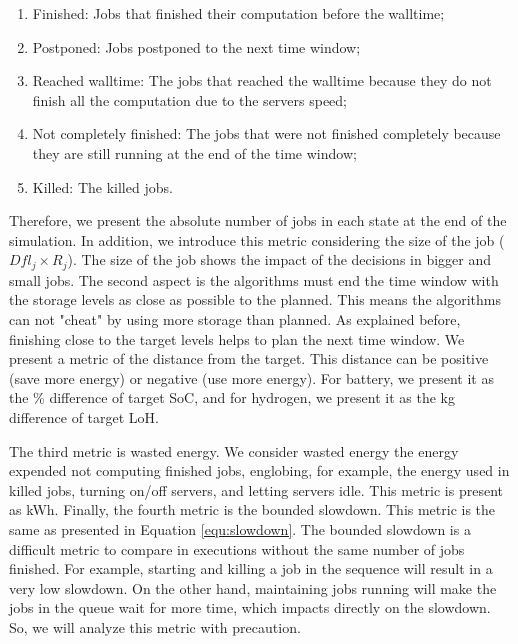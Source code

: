 \begin{enumerate}
    \item Finished: Jobs that finished their computation before the walltime;
    \item Postponed: Jobs postponed to the next time window;
    \item Reached walltime: The jobs that reached the walltime because they do not finish all the computation due to the servers speed;
    \item Not completely finished: The jobs that were not finished completely because they are still running at the end of the time window;
    \item Killed: The killed jobs.
\end{enumerate} 

Therefore, we present the absolute number of jobs in each state at the end of the simulation. In addition, we introduce this metric considering the size of the job ($Dfl_j \times R_j$). The size of the job shows the impact of the decisions in bigger and small jobs. The second aspect is the algorithms must end the time window with the storage levels as close as possible to the planned. This means the algorithms can not "cheat" by using more storage than planned. As explained before, finishing close to the target levels helps to plan the next time window. We present a metric of the distance from the target. This distance can be positive (save more energy) or negative (use more energy). For battery, we present it as the \% difference of target SoC, and for hydrogen, we present it as the kg difference of target LoH.

The third metric is wasted energy. We consider wasted energy the energy expended not computing finished jobs, englobing, for example, the energy used in killed jobs, turning on/off servers, and letting servers idle. This metric is present as kWh. Finally, the fourth metric is the bounded slowdown. This metric is the same as presented in Equation \ref{equ:slowdown}. The bounded slowdown is a difficult metric to compare in executions without the same number of jobs finished. For example, starting and killing a job in the sequence will result in a very low slowdown. On the other hand, maintaining jobs running will make the jobs in the queue wait for more time, which impacts directly on the slowdown. So, we will analyze this metric with precaution.

